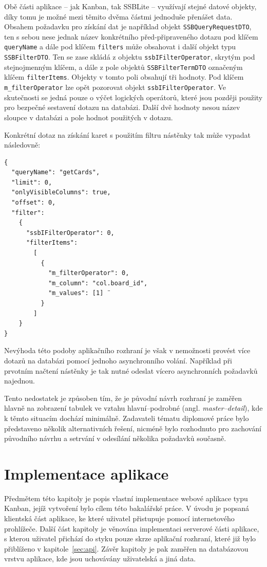 Obě části aplikace -- jak Kanban, tak SSBLite -- využívají stejné datové objekty, díky tomu je možné mezi těmito dvěma částmi jednoduše přenášet data. Obsahem požadavku pro získání dat je například objekt \texttt{SSBQueryRequestDTO}, ten s sebou nese jednak název konkrétního před-připraveného dotazu pod klíčem \texttt{queryName} a dále pod klíčem \texttt{filters} může obsahovat i další objekt typu \texttt{SSBFilterDTO}. Ten se zase skládá z objektu \texttt{ssbIFilterOperator}, skrytým pod stejnojmenným klíčem, a dále z pole objektů \texttt{SSBFilterTermDTO} označeným klíčem \texttt{filterItems}. Objekty v tomto poli obsahují tři hodnoty. Pod klíčem \texttt{m\_filterOperator} lze opět pozorovat objekt \texttt{ssbIFilterOperator}. Ve skutečnosti se jedná pouze o výčet logických operátorů, které jsou později použity pro bezpečné sestavení dotazu na databázi. Další dvě hodnoty nesou název sloupce v databázi a pole hodnot použitých v dotazu.

Konkrétní dotaz na získání karet s použitím filtru nástěnky tak může vypadat následovně:

\begin{verbatim}
{
  "queryName": "getCards",
  "limit": 0,
  "onlyVisibleColumns": true,
  "offset": 0,
  "filter":
    {
      "ssbIFilterOperator": 0,
      "filterItems":
        [
          {
            "m_filterOperator": 0,
            "m_column": "col.board_id",
            "m_values": [1] ¨
          }
        ]
    }
}
\end{verbatim}

Nevýhoda této podoby aplikačního rozhraní je však v nemožnosti provést více dotazů na databázi pomocí jednoho asynchronního volání. Například při prvotním načtení nástěnky je tak nutné odeslat vícero asynchronních požadavků najednou.

Tento nedostatek je způsoben tím, že je původní návrh rozhraní je zaměřen hlavně na zobrazení tabulek ve vztahu hlavní--podrobné (angl. \emph{master--detail}), kde k těmto situacím dochází minimálně. Zadavateli tématu diplomové práce bylo představeno několik alternativních řešení, nicméně bylo rozhodnuto pro zachování původního návrhu a setrvání v odesílání několika požadavků současně. 

\chapter{Implementace aplikace}
Předmětem této kapitoly je popis vlastní implementace webové aplikace typu Kanban, jejíž vytvoření bylo cílem této bakalářské práce. V úvodu je popsaná klientská část aplikace, ke které uživatel přistupuje pomocí internetového prohlížeče. Další část kapitoly je věnována implementaci serverové části aplikace, s kterou uživatel přichází do styku pouze skrze aplikační rozhraní, které již bylo přiblíženo v kapitole~\ref{sec:api}. Závěr kapitoly je pak zaměřen na databázovou vrstvu aplikace, kde jsou uchovávány uživatelská a jiná data.



